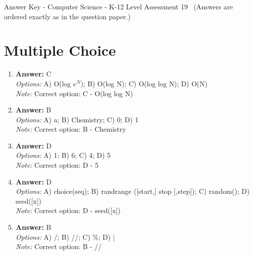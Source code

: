 \documentclass[12pt]{article}
\begin{document}
\begin{center}
Answer Key - Computer Science - K-12 Level Assessment 19 \
\small (Answers are ordered exactly as in the question paper.)
\end{center}

\section*{Multiple Choice}
\begin{enumerate}[label=\arabic*.]
\item \textbf{Answer:} C
\\ \textit{Options:} A) O(log $e^N$); B) O(log N); C) O(log log N); D) O(N)
\\ \textit{Note:} Correct option: C - O(log log N)
\item \textbf{Answer:} B
\\ \textit{Options:} A) a; B) Chemistry; C) 0; D) 1
\\ \textit{Note:} Correct option: B - Chemistry
\item \textbf{Answer:} D
\\ \textit{Options:} A) 1; B) 6; C) 4; D) 5
\\ \textit{Note:} Correct option: D - 5
\item \textbf{Answer:} D
\\ \textit{Options:} A) choice(seq); B) randrange ([start,] stop [,step]); C) random(); D) seed([x])
\\ \textit{Note:} Correct option: D - seed([x])
\item \textbf{Answer:} B
\\ \textit{Options:} A) /; B) //; C) \%; D) |
\\ \textit{Note:} Correct option: B - //
\end{enumerate}
\end{document}
